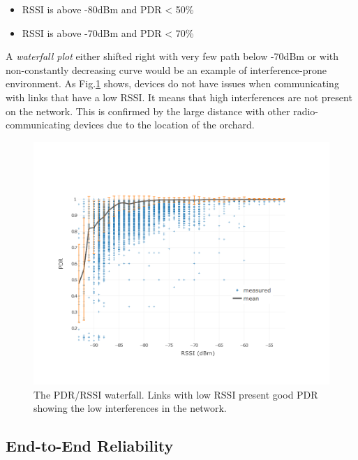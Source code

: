 \documentclass{sig-alternate}
\begin{document}
\begin{itemize}
  \item RSSI is above -80dBm and PDR < 50\%
  \item RSSI is above -70dBm and PDR < 70\%
\end{itemize}


A \textit{waterfall plot} either shifted right with very few path below -70dBm or with non-constantly decreasing curve would be an example of interference-prone environment.
As Fig.\ref{fig:waterfall} shows, devices do not have issues when communicating with links that have a low RSSI.
It means that high interferences are not present on the network.
This is confirmed by the large distance with other radio-communicating devices due to the location of the orchard.

\begin{figure}
    \centering
    \includegraphics[width=\columnwidth]{waterfall}
    \caption{
        The PDR/RSSI waterfall.
        Links with low RSSI present good PDR showing the low interferences in the network.
    }
    \label{fig:waterfall}
\end{figure}

\subsection{End-to-End Reliability}
\label{sec:net_reliability}
\end{document}

